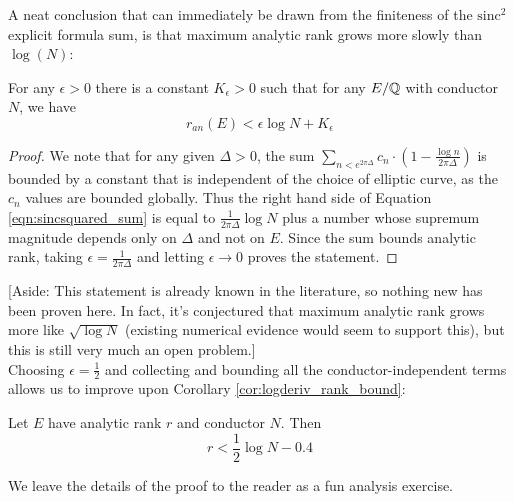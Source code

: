 \documentclass[10pt]{article}
\newcommand{\sinc}{\text{sinc}}
\begin{document}
A neat conclusion that can immediately be drawn from the finiteness of the $\sinc^2$ explicit formula sum, is that maximum analytic rank grows more slowly than $\log(N)$:

\begin{corollary}
For any $\epsilon >0$ there is a constant $K_{\epsilon}>0$ such that for any $E/\mathbb{Q}$ with conductor $N$, we have
\begin{equation}
r_{an}(E) < \epsilon \log N + K_{\epsilon}
\end{equation}
\end{corollary}
\begin{proof}
We note that for any given $\Delta>0$, the sum $ \sum_{n<e^{2\pi \Delta}} c_n \cdot \left(1-\frac{\log n}{2\pi \Delta}\right)$ is bounded by a constant that is independent of the choice of elliptic curve, as the $c_n$ values are bounded globally. Thus the right hand side of Equation \ref{eqn:sincsquared_sum} is equal to $\frac{1}{2\pi \Delta}\log N$ plus a number whose supremum magnitude depends only on $\Delta$ and not on $E$. Since the sum bounds analytic rank, taking $\epsilon = \frac{1}{2\pi \Delta}$ and letting $\epsilon \to 0$ proves the statement.
\end{proof}

[Aside: This statement is already known in the literature, so nothing new has been proven here. In fact, it's conjectured that maximum analytic rank grows more like $\sqrt{\log N}$ (existing numerical evidence would seem to support this), but this is still very much an open problem.] \\

Choosing $\epsilon =\frac{1}{2}$ and collecting and bounding all the conductor-independent terms allows us to improve upon Corollary \ref{cor:logderiv_rank_bound}:
\begin{corollary}\label{cor:better_an_bound}
Let $E$ have analytic rank $r$ and conductor $N$. Then
\begin{equation}
r < \frac{1}{2} \log N - 0.4
\end{equation}
\end{corollary}
We leave the details of the proof to the reader as a fun analysis exercise.\\
\end{document}
